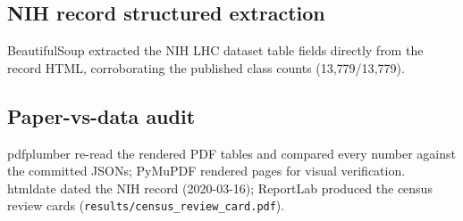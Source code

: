 \subsection{NIH record structured extraction}
BeautifulSoup extracted the NIH LHC dataset table fields directly from the
record HTML, corroborating the published class counts (13{,}779/13{,}779).
\subsection{Paper-vs-data audit}
pdfplumber re-read the rendered PDF tables and compared every number
against the committed JSONs; PyMuPDF rendered pages for visual
verification. htmldate dated the NIH record
(2020-03-16); ReportLab produced the
census review cards (\texttt{results/census\_review\_card.pdf}).

